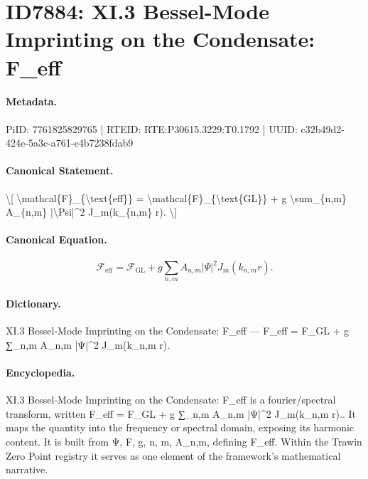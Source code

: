 \section*{ID7884: XI.3 Bessel-Mode Imprinting on the Condensate: F\_eff}
\paragraph{Metadata.}
PiID: 7761825829765 | RTEID: RTE:P30615.3229:T0.1792 | UUID: c32b49d2-424e-5a3c-a761-e4b7238fdab9

\paragraph{Canonical Statement.}
\textbackslash{}[ \textbackslash{}mathcal\{F\}\_\{\textbackslash{}text\{eff\}\} = \textbackslash{}mathcal\{F\}\_\{\textbackslash{}text\{GL\}\} + g \textbackslash{}sum\_\{n,m\} A\_\{n,m\} |\textbackslash{}Psi|\textasciicircum{}2 J\_m(k\_\{n,m\} r). \textbackslash{}]

\paragraph{Canonical Equation.}
\[
\mathcal{F}_{\text{eff}} = \mathcal{F}_{\text{GL}} + g \sum_{n,m} A_{n,m} |\Psi|^2 J_m(k_{n,m} r).
\]

\paragraph{Dictionary.}
XI.3 Bessel-Mode Imprinting on the Condensate: F\_eff — F\_eff = F\_GL + g ∑\_n,m A\_n,m |Ψ|\textasciicircum{}2 J\_m(k\_n,m r).

\paragraph{Encyclopedia.}
XI.3 Bessel-Mode Imprinting on the Condensate: F\_eff is a fourier/spectral transform, written F\_eff = F\_GL + g ∑\_n,m A\_n,m |Ψ|\textasciicircum{}2 J\_m(k\_n,m r).. It maps the quantity into the frequency or spectral domain, exposing its harmonic content. It is built from Ψ, F, g, n, m, A\_n,m, defining F\_eff. Within the Trawin Zero Point registry it serves as one element of the framework's mathematical narrative.

